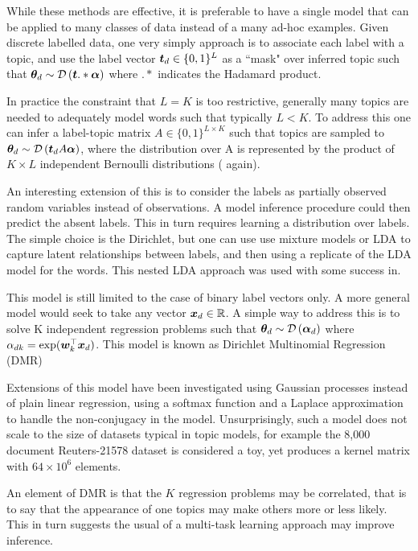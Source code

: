 While these methods are effective, it is preferable to have a single model that can be applied to many classes of data instead of a many ad-hoc examples. Given discrete labelled data, one very simply approach is to associate each label with a topic, and use the label vector $\bm t_d \in \{0,1\}^L$ as a ``mask" over inferred topic such that ${ \bm \theta_d } \sim \mathcal{D} \left( {\bm t .* \bm \alpha} \right)$\cite{Ramage2009} where $.*$ indicates the Hadamard product.

In practice the constraint that $L = K$ is too restrictive, generally many topics are needed to adequately model words such that typically $L < K$. To address this one can infer a label-topic matrix $A \in \{0,1\}^{L \times K}$ such that topics are sampled to ${ \bm \theta_d } \sim \mathcal{D} \left( {\bm t_d A \bm \alpha} \right)$, where the distribution over A is represented by the product of $K \times L$ independent Bernoulli distributions (\cite{Ramage2009} again).

An interesting extension of this is to consider the labels as partially observed random variables instead of observations. A model inference procedure could then predict the absent labels. This in turn requires learning a distribution over labels. The simple choice is the Dirichlet, but one can use use mixture models or LDA to capture latent relationships between labels, and then using a replicate of the LDA model for the words. This nested LDA approach was used with some success in\cite{Rubin2011}. 

This model is still limited to the case of binary label vectors only. A more general model would seek to take any vector ${ \bm x_d } \in \mathbb{R}$. A simple way to address this is to solve K independent regression problems such that ${ \bm \theta_d } \sim \mathcal{D} \left( {\bm \alpha_{d}} \right)$ where $\alpha_{dk} = \exp(\bm w_k^\top\bm x_d)$\cite{Mimno2008}. This model is known as Dirichlet Multinomial Regression (DMR)

Extensions of this model have been investigated using Gaussian processes instead of plain linear regression, using a softmax function\cite{Hennig2012} and a Laplace approximation\cite{WilliamsBarber1998} to handle the non-conjugacy in the model. Unsurprisingly, such a model does not scale to the size of datasets typical in topic models, for example the 8,000 document Reuters-21578 dataset is considered a toy, yet produces a kernel matrix with $64 \times 10^6$ elements.

An element of DMR is that the $K$ regression problems may be correlated, that is to say that the appearance of one topics may make others more or less likely. This in turn suggests the usual of a multi-task learning approach may improve inference.


